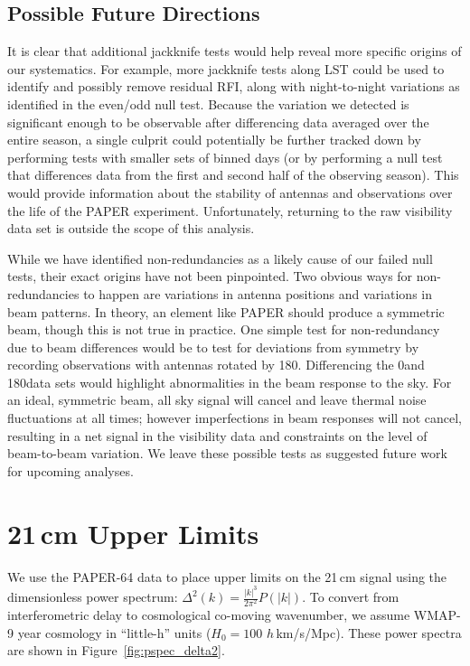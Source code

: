 \subsection{Possible Future Directions}

It is clear that additional jackknife tests would help reveal more specific origins of our systematics. For example, more jackknife tests along LST could be used to identify and possibly remove residual RFI, along with night-to-night variations as identified in the even/odd null test. Because the variation we detected is significant enough to be observable after differencing data averaged over the entire season, a single culprit could potentially be further tracked down by performing tests with smaller sets of binned days (or by performing a null test that differences data from the first and second half of the observing season). This would provide information about the stability of antennas and observations over the life of the PAPER experiment. Unfortunately, returning to the raw visibility data set is outside the scope of this analysis.

While we have identified non-redundancies as a likely cause of our failed null tests, their exact origins have not been pinpointed. Two obvious ways for non-redundancies to happen are variations in antenna positions and variations in beam patterns. In theory, an element like PAPER should produce a symmetric beam, though this is not true in practice. One simple test for non-redundancy due to beam differences would be to test for deviations from symmetry by recording observations with antennas rotated by 180\arcdeg. Differencing the 0\arcdeg and 180\arcdeg data sets would highlight abnormalities in the beam response to the sky. For an ideal, symmetric beam, all sky signal will cancel and leave thermal noise fluctuations at all times; however imperfections in beam responses will not cancel, resulting in a net signal in the visibility data and constraints on the level of beam-to-beam variation. We leave these possible tests as suggested future work for upcoming analyses.

\section{21\,cm Upper Limits}
\label{sec:upperlims}

We use the PAPER-64 data to place upper limits on the 21\,cm signal using the
dimensionless power spectrum: $\Delta^{2}(k)= \frac{|k|^{3}}{2\pi^{2}}P(|k|)$. To convert from
interferometric delay to cosmological co-moving wavenumber, we assume WMAP-9 year cosmology in ``little-h'' units ($ H_{0}=100 $ $ h\, $km/s/Mpc). These power spectra are shown in Figure~\ref{fig:pspec_delta2}.

